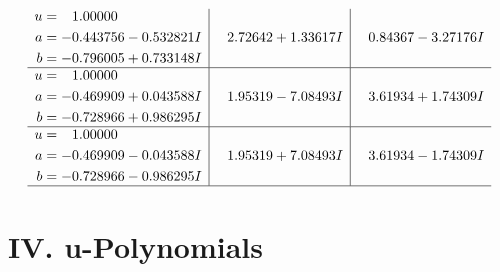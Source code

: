 \documentclass[1p]{elsarticle_modified}
\theoremstyle{definition}
\begin{document}
$$\begin{array}{c|c|c}
\begin{aligned}
u &= \phantom{-}1.00000\phantom{ +0.000000I} \\
a &= -0.443756 - 0.532821 I \\
b &= -0.796005 + 0.733148 I\end{aligned}
 & \phantom{-}2.72642 + 1.33617 I & \phantom{-}0.84367 - 3.27176 I \\ \hline\begin{aligned}
u &= \phantom{-}1.00000\phantom{ +0.000000I} \\
a &= -0.469909 + 0.043588 I \\
b &= -0.728966 + 0.986295 I\end{aligned}
 & \phantom{-}1.95319 - 7.08493 I & \phantom{-}3.61934 + 1.74309 I \\ \hline\begin{aligned}
u &= \phantom{-}1.00000\phantom{ +0.000000I} \\
a &= -0.469909 - 0.043588 I \\
b &= -0.728966 - 0.986295 I\end{aligned}
 & \phantom{-}1.95319 + 7.08493 I & \phantom{-}3.61934 - 1.74309 I\\
 \hline 
 \end{array}$$\newpage
\newpage\renewcommand{\arraystretch}{1}
\centering \section*{ IV. u-Polynomials}
\end{document}
